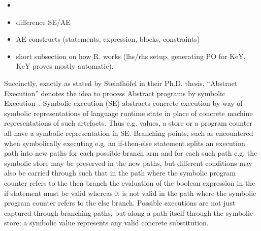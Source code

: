 \begin{itemize}
\item {}
\item difference SE/AE
\item AE constructs (statements, expression, blocks, constraints)
\item short subsection on how R. works (lhs/rhs setup, generating PO
  for KeY, KeY proves mostly automatic).
\end{itemize}


Succinctly, exactly as stated by Steinfhöfel in their Ph.D. thesis, “Abstract Execution” denotes the idea to process Abstract programs by symbolic Execution~\cite{steinhoefel-20}.
Symbolic execution (SE) \cite{DBLP:journals/csur/BaldoniCDDF18,DBLP:journals/ac/YangFBCW19} abstracts concrete execution by way of symbolic representations of language runtime
state in place of concrete machine representations of such artefacts.
Thus e.g. values, a store or a program counter all have a symbolic representation in SE.
Branching points, such as encountered when symbolically executing e.g. an if-then-else statement splits an execution path into new paths for each possible branch arm and for each such
path e.g. the symbolic store may be preserved in the new paths, but different conditions may also be carried through such that in the path where the symbolic program counter refers
to the then branch the evaluation of the boolean expression in the if statement must be valid whereas it is not valid in the path where the symbolic program counter refers to the else branch.
Possible executions are not just captured through branching paths, but along a path itself through the symbolic store; a symbolic value represents any valid concrete substitution.


